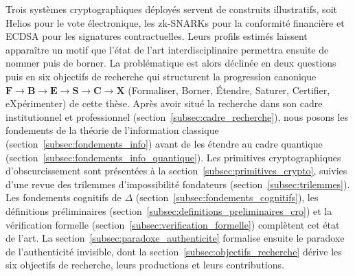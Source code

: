 \begin{sloppypar}
Trois syst\`emes cryptographiques d\'eploy\'es servent de construits
illustratifs, soit Helios pour le vote \'electronique, les zk-SNARKs
pour la conformit\'e financi\`ere et ECDSA pour les signatures
contractuelles. Leurs profils estim\'es laissent appara\^itre un motif que
l'\'etat de l'art interdisciplinaire permettra ensuite de nommer puis de
borner. La probl\'ematique est alors d\'eclin\'ee en deux questions puis en six objectifs de
recherche qui structurent la progression canonique
$\mathbf{F}\to\mathbf{B}\to\mathbf{E}\to\mathbf{S}\to\mathbf{C}\to\mathbf{X}$
(Formaliser, Borner, \'Etendre, Saturer, Certifier, eXp\'erimenter) de
cette th\`ese. Apr\`es avoir situ\'e la recherche dans son cadre
institutionnel et professionnel (section~\ref{subsec:cadre_recherche}), nous
posons les fondements de la th\'eorie de l'information classique
(section~\ref{subsec:fondements_info}) avant de les \'etendre au cadre
quantique (section~\ref{subsec:fondements_info_quantique}). Les primitives
cryptographiques d'obscurcissement sont pr\'esent\'ees \`a la
section~\ref{subsec:primitives_crypto}, suivies d'une revue des trilemmes
d'impossibilit\'e fondateurs (section~\ref{subsec:trilemmes}). Les fondements cognitifs de
$\Delta$ (section~\ref{subsec:fondements_cognitifs}), les d\'efinitions pr\'eliminaires
(section~\ref{subsec:definitions_preliminaires_cro}) et la v\'erification formelle
(section~\ref{subsec:verification_formelle}) compl\`etent cet \'etat de l'art. La
section~\ref{subsec:paradoxe_authenticite} formalise ensuite le paradoxe de
l'authenticit\'e invisible, dont la section~\ref{subsec:objectifs_recherche}
d\'erive les six objectifs de recherche, leurs productions et leurs contributions.
\end{sloppypar}